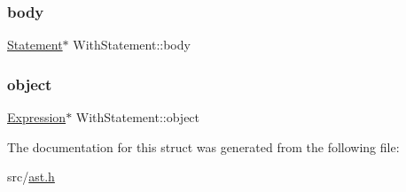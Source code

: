 \subsubsection{\texorpdfstring{body}{body}}
{\footnotesize\ttfamily \hyperlink{struct_statement}{Statement}$\ast$ With\+Statement\+::body}

\mbox{\label{struct_with_statement_a1563aab5799cbe5112e7a0429f4956bd}} 
\subsubsection{\texorpdfstring{object}{object}}
{\footnotesize\ttfamily \hyperlink{struct_expression}{Expression}$\ast$ With\+Statement\+::object}



The documentation for this struct was generated from the following file\+:\begin{DoxyCompactItemize}
\item 
src/\hyperlink{ast_8h}{ast.\+h}\end{DoxyCompactItemize}
